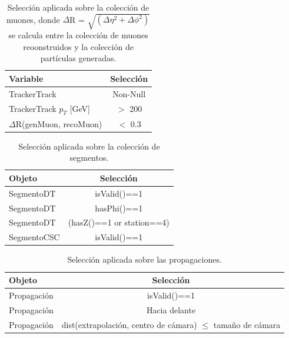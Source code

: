 \begin{table}[htbp]
  \begin{center}
    {\normalsize
      \begin{tabular} {lc}
        \hline
        \hline
        Variable & Selecci\'on \\
        \hline
        TrackerTrack                          & Non-Null      \\
        TrackerTrack $p_{T}$ [GeV]            & $>$ 200       \\
        $\Delta$R(genMuon, recoMuon)          & $<$ 0.3       \\
        \hline
      \end{tabular}
    }
    \caption{Selecci\'on aplicada sobre la colecci\'on de muones, donde $\Delta$R = $\sqrt{(\Delta\eta^{2}+\Delta\phi^{2})}$ se calcula entre la colecci\'on de muones reoonstruidos y la colecci\'on de part\'iculas generadas.}
    \label{tab:muon_sel}
  \end{center}
\end{table}




\begin{table}[htbp]
  \begin{center}
    {\normalsize
      \begin{tabular} {lc}
        \hline
        \hline
        Objeto & Selecci\'on \\
        \hline
        SegmentoDT            & isValid()==1      \\
        SegmentoDT            & hasPhi()==1       \\
        SegmentoDT            & (hasZ()==1 or station==4)   \\
        SegmentoCSC           & isValid()==1      \\
        \hline
      \end{tabular}
    }
    \caption{Selecci\'on aplicada sobre la colecci\'on de segmentos.}
    \label{tab:segment_sel}
  \end{center}
\end{table}



\begin{table}[htbp]
  \begin{center}
    {\normalsize
      \begin{tabular} {lc}
        \hline
        \hline
        Objeto & Selecci\'on \\
        \hline
        Propagaci\'on          & isValid()==1                                                                 \\
        Propagaci\'on          & Hacia delante                                                                \\
        Propagaci\'on          & dist(extrapolaci\'on, centro de c\'amara) $\leq$ tamaño de c\'amara      \\
        \hline
      \end{tabular}
    }
    \caption{Selecci\'on aplicada sobre las propagaciones.}
    \label{tab:prop_sel}
  \end{center}
\end{table}




